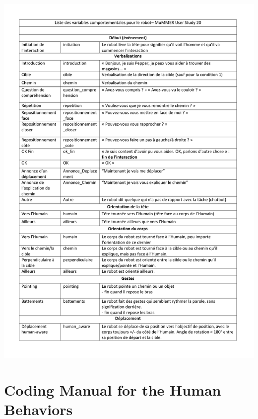 \begin{center}
	\includegraphics[page=2, width=\textwidth]{figures/annexe1/ROBOTrepertoirecomportemental_MuMMER.pdf} 
\end{center}

\section{Coding Manual for the Human Behaviors}\label{app:coding_h}

